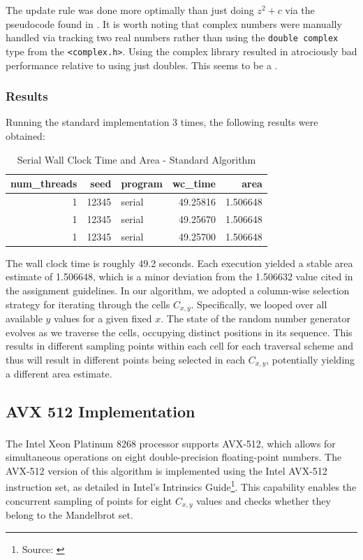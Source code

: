 \documentclass{article}
\newcommand{\MYhref}[3][blue]{\href{#2}{\color{#1}{#3}}}%
\begin{document}
The update rule was done more optimally than just doing $z^2 + c$ via the pseudocode 
found in \MYhref{https://en.wikipedia.org/wiki/Mandelbrot_set}{Wikipedia}.
It is worth noting that complex numbers were manually handled via tracking two real numbers 
rather than using the \texttt{double complex} type from the \texttt{<complex.h>}. Using the complex 
library resulted in atrociously bad performance relative to using just doubles. This seems to 
be a \MYhref{https://stackoverflow.com/questions/42659668/stdcomplex-multiplication-is-extremely-slow}{a common issue}.

\subsubsection{Results}
Running the standard implementation 3 times, the following results were obtained:
\begin{table}[H]
    \centering
    \caption{Serial Wall Clock Time and Area - Standard Algorithm}
    \fontsize{12}{14}\selectfont
    \begin{tabular}[t]{r|r|l|r|r}
    \hline
    num\_threads & seed & program & wc\_time & area\\
    \hline
    1 & 12345 & serial & 49.25816 & 1.506648\\
    \hline
    1 & 12345 & serial & 49.25670 & 1.506648\\
    \hline
    1 & 12345 & serial & 49.25700 & 1.506648\\
    \hline
    \end{tabular}
\end{table}
\noindent The wall clock time is roughly 49.2 seconds. 
Each execution yielded a stable area estimate of 1.506648, 
which is a minor deviation from the 1.506632 value cited in the assignment guidelines. 
In our algorithm, we adopted a column-wise selection strategy for iterating through the cells \( C_{x,y} \). 
Specifically, we looped over all available \( y \) values for a given fixed \( x \). 
The state of the random number generator evolves as we traverse the cells, 
occupying distinct positions in its sequence. 
This results in different sampling points within each cell for each traversal scheme and thus 
will result in different points being selected in each $C_{x,y}$, potentially yielding a 
different area estimate. 

\subsection{AVX 512 Implementation}
The Intel\textsuperscript{\textregistered} Xeon\textsuperscript{\textregistered} 
Platinum 8268 processor supports AVX-512, which allows for simultaneous operations 
on eight double-precision floating-point numbers. The AVX-512 version of this 
algorithm is implemented using the Intel AVX-512 instruction set, as detailed 
in Intel's Intrinsics Guide\footnote{Source: \MYhref{https://www.intel.com/content/www/us/en/docs/intrinsics-guide/index.html}{Intel Intrinsics Guide}}. 
This capability enables the concurrent sampling of points for eight \( C_{x,y} \) 
values and checks whether they belong to the Mandelbrot set.
\end{document}

